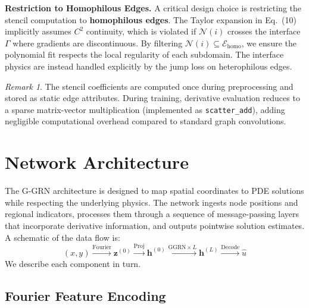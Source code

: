 \documentclass[11pt]{article}
\theoremstyle{definition}
\theoremstyle{remark}
\newtheorem{remark}{Remark}
\theoremstyle{plain}
\begin{document}
\textbf{Restriction to Homophilous Edges.}
A critical design choice is restricting the stencil computation to \textbf{homophilous edges}. The Taylor expansion in Eq.~(10) implicitly assumes $C^2$ continuity, which is violated if $\mathcal{N}(i)$ crosses the interface $\Gamma$ where gradients are discontinuous. By filtering $\mathcal{N}(i) \subseteq \mathcal{E}_{\mathrm{homo}}$, we ensure the polynomial fit respects the local regularity of each subdomain. The interface physics are instead handled explicitly by the jump loss on heterophilous edges.

\begin{remark}
    The stencil coefficients are computed once during preprocessing and stored as static edge attributes. During training, derivative evaluation reduces to a sparse matrix-vector multiplication (implemented as \texttt{scatter\_add}), adding negligible computational overhead compared to standard graph convolutions.
\end{remark}

\section{Network Architecture}
\label{sec:architecture}

The G-GRN architecture is designed to map spatial coordinates to PDE solutions while respecting the underlying physics. The network ingests node positions and regional indicators, processes them through a sequence of message-passing layers that incorporate derivative information, and outputs pointwise solution estimates. A schematic of the data flow is:
\begin{equation}
    (x, y) \xrightarrow{\text{Fourier}} \mathbf{z}^{(0)} \xrightarrow{\text{Proj}} \mathbf{h}^{(0)} \xrightarrow{\text{GGRN} \times L} \mathbf{h}^{(L)} \xrightarrow{\text{Decode}} \hat{u}
\end{equation}
We describe each component in turn.

\subsection{Fourier Feature Encoding}
\end{document}
